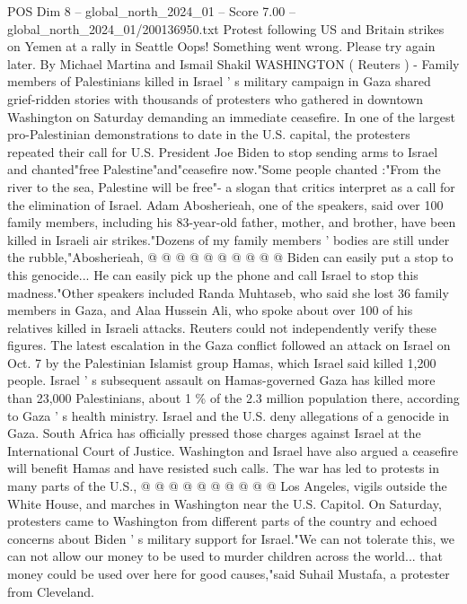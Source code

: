 \begin{textsample}{POS Dim 8 – global\_north\_2024\_01 – Score 7.00 – global\_north\_2024\_01/200136950.txt}  \label{ex:f8_pos_187}
Protest following US and Britain strikes on Yemen at a rally in Seattle Oops!
Something went wrong.
Please try again later.
By Michael Martina and Ismail Shakil WASHINGTON ( Reuters ) - Family members of Palestinians killed in Israel ' s military campaign in Gaza shared grief-ridden stories with thousands of protesters who gathered in downtown Washington on Saturday demanding an immediate ceasefire.
In one of the largest pro-Palestinian demonstrations to date in the U.S. capital, the protesters repeated their call for U.S.
President Joe Biden to stop sending arms to Israel and chanted"free Palestine"and"ceasefire now."Some people chanted :"From the river to the sea, Palestine will be free"- a slogan that critics interpret as a call for the elimination of Israel.
Adam Abosherieah, one of the speakers, said over 100 family members, including his 83-year-old father, mother, and brother, have been killed in Israeli air strikes."Dozens of my family members ' bodies are still under the rubble,"Abosherieah, @ @ @ @ @ @ @ @ @ @ Biden can easily put a stop to this genocide...
He can easily pick up the phone and call Israel to stop this madness."Other speakers included Randa Muhtaseb, who said she lost 36 family members in Gaza, and Alaa Hussein Ali, who spoke about over 100 of his relatives killed in Israeli attacks.
Reuters could not independently verify these figures.
The latest escalation in the Gaza conflict followed an attack on Israel on Oct. 7 by the Palestinian Islamist group Hamas, which Israel said killed 1,200 people.
Israel ' s subsequent assault on Hamas-governed Gaza has killed more than 23,000 Palestinians, about 1 \% of the 2.3 million population there, according to Gaza ' s health ministry.
Israel and the U.S. deny allegations of a genocide in Gaza.
South Africa has officially pressed those charges against Israel at the International Court of Justice.
Washington and Israel have also argued a ceasefire will benefit Hamas and have resisted such calls.
The war has led to protests in many parts of the U.S., @ @ @ @ @ @ @ @ @ @ Los Angeles, vigils outside the White House, and marches in Washington near the U.S.
Capitol.
On Saturday, protesters came to Washington from different parts of the country and echoed concerns about Biden ' s military support for Israel."We can not tolerate this, we can not allow our money to be used to murder children across the world... that money could be used over here for good causes,"said Suhail Mustafa, a protester from Cleveland.

\end{textsample}
